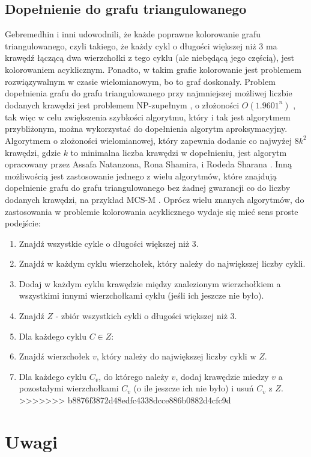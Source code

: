 \documentclass{article}
\begin{document}
\subsection{Dopełnienie do grafu triangulowanego}
Gebremedhin i inni udowodnili, że każde poprawne kolorowanie grafu triangulowanego, czyli takiego, że każdy cykl o długości większej niż 3 ma krawędź łączącą dwa wierzchołki z tego cyklu (ale niebędącą jego częścią), jest kolorowaniem acyklicznym. \cite{Gb} Ponadto, w takim grafie kolorowanie jest problemem rozwiązywalnym w czasie wielomianowym, bo to graf doskonały.
Problem dopełnienia grafu do grafu triangulowanego przy najmniejszej możliwej liczbie dodanych krawędzi jest problemem NP-zupełnym \cite{NPC}, o złożoności $O(1.9601^n)$ \cite{Cmp}, tak więc w celu zwiększenia szybkości algorytmu, który i tak jest algorytmem przybliżonym, można wykorzystać do dopełnienia algorytm aproksymacyjny. Algorytmem o złożoności wielomianowej, który zapewnia dodanie co najwyżej $8k^2$ krawędzi, gdzie $k$ to minimalna liczba krawędzi w dopełnieniu, jest algorytm opracowany przez Assafa Natanzona, Rona Shamira, i Rodeda Sharana \cite{Approx}. Inną możliwością jest zastosowanie jednego z wielu algorytmów, które znajdują dopełnienie grafu do grafu triangulowanego bez żadnej gwarancji co do liczby dodanych krawędzi, na przykład MCS-M \cite{MCS-M}. Oprócz wielu znanych algorytmów, do zastosowania w problemie kolorowania acyklicznego wydaje się mieć sens proste podejście:
\begin{enumerate}
\item Znajdź wszystkie cykle o długości większej niż 3.
\item Znajdź w każdym cyklu wierzchołek, który należy do największej liczby cykli.
\item Dodaj w każdym cyklu krawędzie między znalezionym wierzchołkiem a wszystkimi innymi wierzchołkami cyklu (jeśli ich jeszcze nie było).
\item Znajdź $Z$ - zbiór wszystkich cykli o długości większej niż 3.
\item Dla każdego cyklu $C \in Z$:
\item Znajdź wierzchołek $v$, który należy do największej liczby cykli w $Z$.
\item Dla każdego cyklu $C_v$, do którego należy $v$, dodaj krawędzie miedzy $v$ a pozostałymi wierzchołkami $C_v$ (o ile jeszcze ich nie było) i usuń $C_v$ z $Z$.
>>>>>>> b8876f3872d48edfc4338dcce886b0882d4cfc9d
\end{enumerate}
\section{Uwagi}
\end{document}
